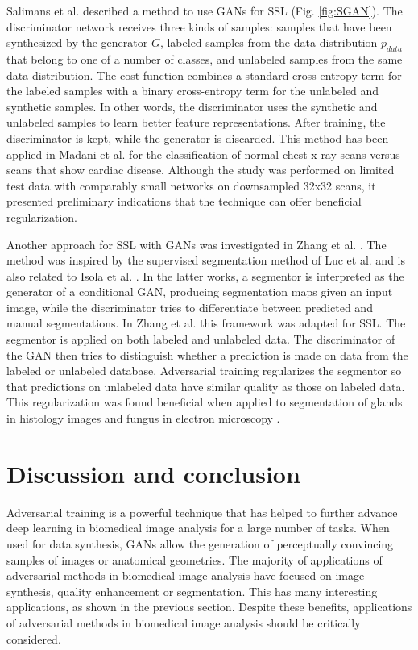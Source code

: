 \documentclass{article}
\begin{document}
Salimans et al. \cite{Sali16} described a method to use GANs for SSL (Fig. \ref{fig:SGAN}). The discriminator network receives three kinds of samples: samples that have been synthesized by the generator $G$, labeled samples from the data distribution $p_{data}$ that belong to one of a number of classes, and unlabeled samples from the same data distribution. The cost function combines a standard cross-entropy term for the labeled samples with a binary cross-entropy term for the unlabeled and synthetic samples. In other words, the discriminator uses the synthetic and unlabeled samples to learn better feature representations. After training, the discriminator is kept, while the generator is discarded. This method has been applied in
Madani et al. \cite{madani2018semi} for the classification of normal chest x-ray scans versus scans that show cardiac disease. Although the study was performed on limited test data with comparably small networks on downsampled 32x32 scans, it presented preliminary indications that the technique can offer beneficial regularization.

Another approach for SSL with GANs was investigated in Zhang et al. \cite{zhang2017deep}. The method was inspired by the supervised segmentation method of Luc et al. \cite{Luc16} and is also related to Isola et al. \cite{Isol17}. In the latter works, a segmentor is interpreted as the generator of a conditional GAN, producing segmentation maps given an input image, while the discriminator tries to differentiate between predicted and manual segmentations. In Zhang et al. \cite{zhang2017deep} this framework was adapted for SSL. The segmentor is applied on both labeled and unlabeled data. The discriminator of the GAN then tries to distinguish whether a prediction is made on data from the labeled or unlabeled database. 
Adversarial training regularizes the segmentor so that predictions on unlabeled data have similar quality as those on labeled data. This regularization was found beneficial when applied to segmentation of glands in histology images and fungus in electron microscopy \cite{zhang2017deep}.

\section{Discussion and conclusion}
\label{sec:discuss}
Adversarial training is a powerful technique that has helped to further advance deep learning in biomedical image analysis for a large number of tasks. When used for data synthesis, GANs allow the generation of perceptually convincing samples of images or anatomical geometries. The majority of applications of adversarial methods in biomedical image analysis have focused on image synthesis, quality enhancement or segmentation. This has many interesting applications, as shown in the previous section. Despite these benefits, applications of adversarial methods in biomedical image analysis should be critically considered. 
\end{document}

